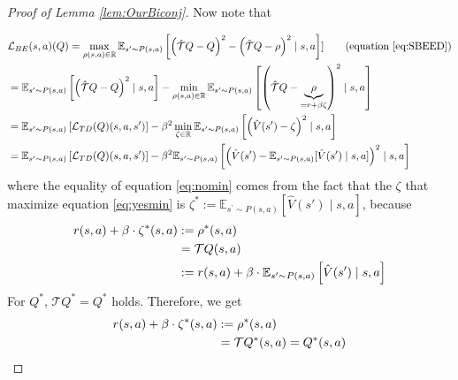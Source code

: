 \begin{proof}[Proof of Lemma \ref{lem:OurBiconj}]
Now note that
    
     \begin{align}
     &\mathcal{L}_{BE}(s,a)(Q)= \max_{\rho(s,a)\in \mathbb{R}}\mathbb{E}_{ s^\prime \sim P(s, a)}\left[   \left(\hat{\mathcal{T}}{Q}-Q\right)^2-\left(\hat{\mathcal{T}}{Q}- \rho\right)^2\mid s, a\right]] \tag{equation \ref{eq:SBEED}}
    \\
    &= \mathbb{E}_{ s^\prime \sim P(s, a)}\left[ \left(\hat{\mathcal{T}}{Q}-Q\right)^2\mid s,a \right]-\min_{\rho(s,a)\in \mathbb{R}}\mathbb{E}_{ s^\prime \sim P(s, a)}\left[\left(\hat{\mathcal{T}}{Q}- \underbrace{\rho}_{= r+\beta \zeta}\right)^2\mid s, a\right]  \notag
    \\
    &= \mathbb{E}_{ s^\prime \sim P(s, a)}\left[\mathcal{L}_{TD}(Q)(s,a,s^\prime)\right]-\beta^2 \min_{\zeta\in \mathbb{R}}\mathbb{E}_{ s^\prime \sim P(s, a)}\left[\left(\hat{V}(s^\prime)- \zeta\right)^2\mid s, a\right]\label{eq:yesmin}
    \\
    &= \mathbb{E}_{ s^\prime \sim P(s, a)}\left[\mathcal{L}_{TD}(Q)(s,a, s^\prime)\right]-\beta^2 \mathbb{E}_{ s^\prime \sim P(s, a)}\left[\left(\hat{V}(s^\prime)- \mathbb{E}_{ s^\prime \sim P(s, a)}[\hat{V}(s^\prime)\mid s,a]\right)^2\mid s, a\right]\label{eq:nomin}
    \end{align}
where the equality of equation \ref{eq:nomin} comes from the fact that the $\zeta$ that maximize equation \ref{eq:yesmin} is $\zeta^* := \mathbb{E}_{ s^\prime \sim P(s, a)}[\hat{V}(s')\mid s,a]$, because
\begin{align}
r(s,a)+\beta \cdot \zeta^{*} (s,a) &:=  \rho^{*}(s,a)\notag
     \\
     &= \mathcal{T}Q(s,a) \notag
     \\
     &:=r(s,a)+\beta \cdot \mathbb{E}_{ s^\prime \sim P(s, a)}\left[\hat{V}(s^\prime)\mid s,a\right]\notag
\end{align}
For $Q^\ast$, $\mathcal{T}Q^\ast=Q^\ast$ holds. Therefore, we get
\begin{align}
r(s,a)+\beta \cdot \zeta^{*} (s,a) &:=  \rho^{*}(s,a)\notag
     \\
     &= \mathcal{T}Q^\ast(s,a) = Q^\ast(s,a) \notag
\end{align}
\end{proof}


